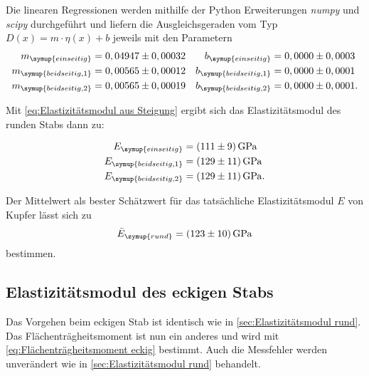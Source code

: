 Die linearen Regressionen werden mithilfe der Python Erweiterungen \textit{numpy}\cite{numpy} und \textit{scipy}\cite{scipy} 
durchgeführt und liefern die Ausgleichsgeraden vom Typ $D(x)=m\cdot\eta(x) + b$ jeweils mit den Parametern
\begin{align}
  m_{\symup{einseitig}} &= 0,04947\pm0,00032 & b_{\symup{einseitig}} &= 0,0000\pm0,0003 \notag \\
  m_{\symup{beidseitig,1}} &= 0,00565\pm0,00012 & b_{\symup{beidseitig,1}} &= 0,0000\pm0,0001 \notag \\
  m_{\symup{beidseitig,2}} &= 0,00565\pm0,00019 & b_{\symup{beidseitig,2}} &= 0,0000\pm0,0001. \notag
\end{align}


Mit \autoref{eq:Elastizitätsmodul aus Steigung} ergibt sich das Elastizitätsmodul des runden Stabs dann zu:

\begin{align}
  E_{\symup{einseitig}}&=\qty{111+-9}{\giga\pascal} \notag \\
  E_{\symup{beidseitig,1}}&=\qty{129+-11}{\giga\pascal} \notag \\
  E_{\symup{beidseitig,2}}&=\qty{129+-11}{\giga\pascal}. \notag
\end{align}

Der Mittelwert als bester Schätzwert für das tatsächliche Elastizitätsmodul $E$ von Kupfer lässt sich zu
\begin{equation}
  \bar{E}_{\symup{rund}} = \qty{123+-10}{\giga\pascal} \notag
\end{equation}
bestimmen.

\subsection{Elastizitätsmodul des eckigen Stabs}  %
\label{sec:Elastizitätsmodul eckig}

Das Vorgehen beim eckigen Stab ist identisch wie in \autoref{sec:Elastizitätsmodul rund}.
Das Flächenträgheitsmoment ist nun ein anderes und wird mit \autoref{eq:Flächenträgheitsmoment eckig} bestimmt.
Auch die Messfehler werden unverändert wie in \autoref{sec:Elastizitätsmodul rund} behandelt.

